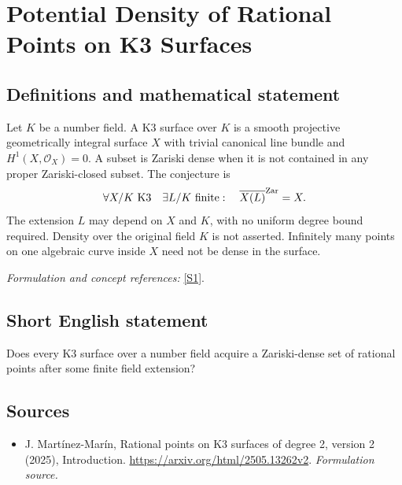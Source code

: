 \documentclass[11pt]{article}
\begin{document}
\section*{\texorpdfstring{Potential Density of Rational Points on K3 Surfaces}{Potential Density of Rational Points on K3 Surfaces}}\label{30006962}
\subsection{Definitions and mathematical statement}
Let $K$ be a number field. A K3 surface over $K$ is a smooth projective geometrically integral surface $X$ with trivial canonical line bundle and $H^1(X,\mathcal O_X)=0$. A subset is Zariski dense when it is not contained in any proper Zariski-closed subset. The conjecture is
\[
 \forall X/K\text{ K3}\quad\exists L/K\text{ finite}:\quad
 \overline{X(L)}^{\rm Zar}=X.
\]
The extension $L$ may depend on $X$ and $K$, with no uniform degree bound required. Density over the original field $K$ is not asserted. Infinitely many points on one algebraic curve inside $X$ need not be dense in the surface.
\par\smallskip\textit{Formulation and concept references:} \href{https://arxiv.org/html/2505.13262v2}{[S1]}.

\subsection{Short English statement}
Does every K3 surface over a number field acquire a Zariski-dense set of rational points after some finite field extension?
\subsection{Sources}
\begin{itemize}
\item[S1]J. Martínez-Marín, Rational points on K3 surfaces of degree 2, version 2 (2025), Introduction.
\url{https://arxiv.org/html/2505.13262v2}.
\textit{Formulation source.}
\end{itemize}
\end{document}
